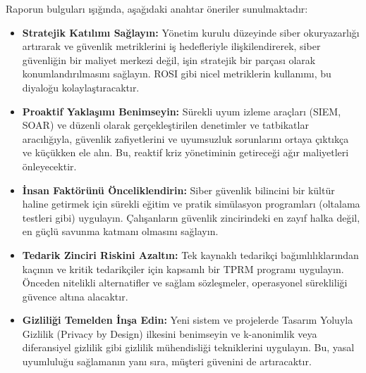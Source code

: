Raporun bulguları ışığında, aşağıdaki anahtar öneriler sunulmaktadır:
\begin{itemize}
    \item \textbf{Stratejik Katılımı Sağlayın:} Yönetim kurulu düzeyinde siber okuryazarlığı artırarak ve güvenlik metriklerini iş hedefleriyle ilişkilendirerek, siber güvenliğin bir maliyet merkezi değil, işin stratejik bir parçası olarak konumlandırılmasını sağlayın. ROSI gibi nicel metriklerin kullanımı, bu diyaloğu kolaylaştıracaktır.
    \item \textbf{Proaktif Yaklaşımı Benimseyin:} Sürekli uyum izleme araçları (SIEM, SOAR) ve düzenli olarak gerçekleştirilen denetimler ve tatbikatlar aracılığıyla, güvenlik zafiyetlerini ve uyumsuzluk sorunlarını ortaya çıktıkça ve küçükken ele alın. Bu, reaktif kriz yönetiminin getireceği ağır maliyetleri önleyecektir.
    \item \textbf{İnsan Faktörünü Önceliklendirin:} Siber güvenlik bilincini bir kültür haline getirmek için sürekli eğitim ve pratik simülasyon programları (oltalama testleri gibi) uygulayın. Çalışanların güvenlik zincirindeki en zayıf halka değil, en güçlü savunma katmanı olmasını sağlayın.
    \item \textbf{Tedarik Zinciri Riskini Azaltın:} Tek kaynaklı tedarikçi bağımlılıklarından kaçının ve kritik tedarikçiler için kapsamlı bir TPRM programı uygulayın. Önceden nitelikli alternatifler ve sağlam sözleşmeler, operasyonel sürekliliği güvence altına alacaktır.
    \item \textbf{Gizliliği Temelden İnşa Edin:} Yeni sistem ve projelerde Tasarım Yoluyla Gizlilik (Privacy by Design) ilkesini benimseyin ve k-anonimlik veya diferansiyel gizlilik gibi gizlilik mühendisliği tekniklerini uygulayın. Bu, yasal uyumluluğu sağlamanın yanı sıra, müşteri güvenini de artıracaktır.
\end{itemize}